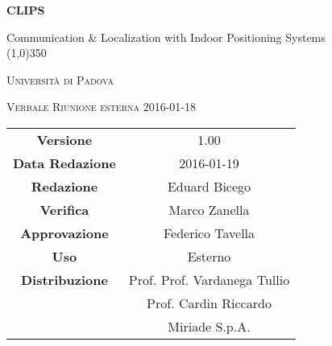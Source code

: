 \documentclass[a4paper,12pt]{article}
\author{Eduard Bicego}
\date{19/01/2016}
\begin{document}
\begin{titlepage}
	\centering
	{\huge\bfseries CLIPS\par}
	Communication \& Localization with Indoor Positioning Systems \\
	\line(1,0){350} \\
	{\scshape\LARGE Università di Padova \par}
	\vspace{1cm}
	{\scshape\Large Verbale Riunione esterna 2016-01-18 \par}
	\logo
	\newpage
	\begin{tabular}{c|c}
		{\hfill \textbf{Versione}} 			& 1.00				\\ 
		{\hfill\textbf{Data Redazione}} 	& 2016-01-19  		\\ 
		{\hfill\textbf{Redazione}} 			& Eduard Bicego		 \\
		{\hfill\textbf{Verifica}} 			& Marco Zanella		\\ 
		{\hfill\textbf{Approvazione}} 		& Federico Tavella	\\ 
		{\hfill\textbf{Uso}} 				& Esterno			\\ 
		{\hfill\textbf{Distribuzione}} 		& Prof. Prof. Vardanega Tullio \\
											& Prof. Cardin Riccardo \\
											& Miriade S.p.A. \\ 
	\end{tabular}
\end{titlepage}
	
	\newpage

	
	\label{LastFrontPage}
	

	\newpage
	
	\pagestyle{mymain}
	
	
		

	
		
	
	\newpage
		
	
	\newpage
		
				
	\label{LastPage}
\end{document}
